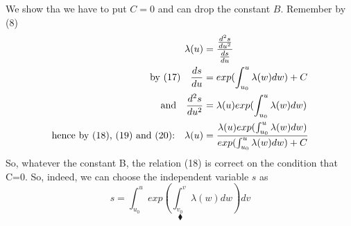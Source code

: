 We show tha we have to put $C=0$ and can drop the constant $B$. Remember by (8)
\begin{align}
\lambda (u) &= \frac{\dv[2]{s}{u}}{\dv{s}{u}}\\
\text{by (17)} \quad \dv{s}{u}  &=exp(\int^u_{u_0} \lambda (w)dw) +C\\
\text{and}\quad \dv[2]{s}{u}  &= \lambda (u) exp(\int^u_{u_0} \lambda (w)dw) \\
\text{hence by (18), (19) and (20):} \quad \lambda (u)&= \frac{\lambda (u) exp(\int^u_{u_0} \lambda (w)dw)}{exp(\int^u_{u_0} \lambda (w)dw) +C}
\end{align}
So, whatever the constant B, the relation (18) is correct on the condition that C=0. 
So, indeed, we can choose the independent variable $s$ as
$$s  =\int^u_{u_0}  exp(\int^v_{v_0} \lambda (w)dw)dv $$ 
$$\blacklozenge$$
\newpage

